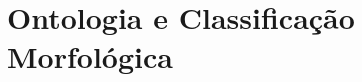 \documentclass[
	12pt,				%
	openright,			%
	twoside,			%
	a4paper,			%
  sumario=tradicional,
	english,			%
	french,				%
	spanish,			%
	brazil				%
	]{abntex2}
\begin{document}
\begingroup
\hypersetup{linkcolor=black}
\tableofcontents*
\cleardoublepage
\endgroup


\textual

% 
% 
\part{Ontologia e Classificação Morfológica}



% 
% 


% 


% 
% 
% 

\postextual



%
%

\end{document}
